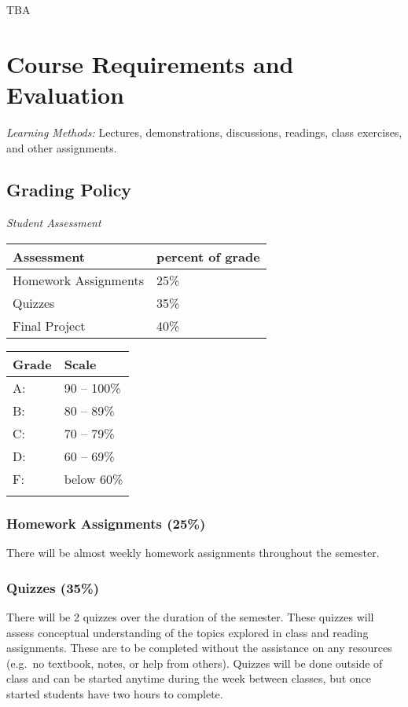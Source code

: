 \documentclass[11pt,]{article}
\begin{document}
TBA

\hypertarget{course-requirements-and-evaluation}{%
\section{Course Requirements and
Evaluation}\label{course-requirements-and-evaluation}}

\emph{Learning Methods:} Lectures, demonstrations, discussions,
readings, class exercises, and other assignments.

\hypertarget{grading-policy}{%
\subsection{Grading Policy}\label{grading-policy}}

\emph{Student Assessment}

\begin{longtable}[]{@{}ll@{}}
\toprule
Assessment & percent of grade\tabularnewline
\midrule
\endhead
Homework Assignments & 25\%\tabularnewline
Quizzes & 35\%\tabularnewline
Final Project & 40\%\tabularnewline
\bottomrule
\end{longtable}

\begin{longtable}[]{@{}ll@{}}
\toprule
Grade & Scale\tabularnewline
\midrule
\endhead
A: & 90 -- 100\%\tabularnewline
B: & 80 -- 89\%\tabularnewline
C: & 70 -- 79\%\tabularnewline
D: & 60 -- 69\%\tabularnewline
F: & below 60\%\tabularnewline
&\tabularnewline
\bottomrule
\end{longtable}

\hypertarget{homework-assignments-25}{%
\subsubsection{Homework Assignments
(25\%)}\label{homework-assignments-25}}

There will be almost weekly homework assignments throughout the
semester.

\hypertarget{quizzes-35}{%
\subsubsection{Quizzes (35\%)}\label{quizzes-35}}

There will be 2 quizzes over the duration of the semester. These quizzes
will assess conceptual understanding of the topics explored in class and
reading assignments. These are to be completed without the assistance on
any resources (e.g.~no textbook, notes, or help from others). Quizzes
will be done outside of class and can be started anytime during the week
between classes, but once started students have two hours to complete.
\end{document}

